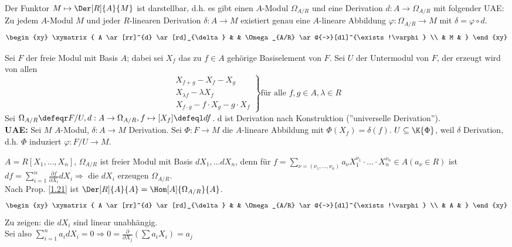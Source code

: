 \begin{PropDef}
\label{1.21}
  Der Funktor $M \mapsto \Der[R]{A}{M}$ ist \glqq darstellbar\grqq, d.h. es
  gibt
  einen $A$-Modul $\Omega_{A/R}$ und eine Derivation $d: A \to \Omega_{A/R}$ mit
  folgender UAE:\\
  Zu jedem $A$-Modul $M$ und jeder $R$-linearen Derivation $\delta: A \to M$
  existiert genau eine $A$-lineare Abbildung $\varphi: \Omega_{A/R} \to M$ mit
  $\delta = \varphi \circ d$.
  \[
    \begin{xy}
      \xymatrix{
         A \ar[rr]^{d} \ar[rd]_{\delta}  &     &  \Omega_{A/R} \ar@{-->}[dl]^{\exists!\varphi}  \\
                                         &  M  &
      }
    \end{xy}
  \]
\end{PropDef}

\begin{Bew}
  Sei $F$ der freie Modul mit Basis $A$; dabei sei $X_f$ das zu $f \in A$
  gehörige Basiselement von $F$.
  Sei $U$ der Untermodul von $F$, der erzeugt wird von allen
  \[\left. \begin{array}{l}
       X_{f+g} - X_f - X_g\\
       X_{\lambda f} - \lambda X_f\\
       X_{f \cdot g} - f \cdot X_g - g \cdot X_f
     \end{array} \right\} \text{für alle } f,g \in A, \lambda \in R\]
  Sei $\Omega_{A/R} \defeqr F/U, d: A \to \Omega_{A/R}, f \mapsto [X_f] \defeql
  d f$. d ist Derivation nach Konstruktion (''universelle Derivation'').\\
  \textbf{UAE:} Sei $M$ $A$-Modul, $\delta: A \to M$ Derivation. Sei $\Phi: F \to
  M$ die $A$-lineare Abbildung mit $\Phi(X_f) = \delta(f)$. $U \subseteq
  \K{\Phi}$, weil $\delta$ Derivation, d.h. $\Phi$ induziert $\varphi:
  F/U \to M$.
\end{Bew}

\begin{nnBsp}
  $A = R[X_1, \dots , X_n]$, $\Omega_{A/R}$ ist freier Modul mit Basis $d X_1,
  \dots d X_n$, denn für $f = \sum_{\nu = (\nu_1, \dots , \nu_n)} a_{\nu}
  X_1^{\nu_1} \cdot \dots \cdot X_n^{\nu_n} \in A (a_{\nu} \in R)$ ist $d f =
  \sum_{i=1}^n \frac{\partial f}{\partial X_i} d X_i \Rightarrow$ die $d X_i$
  erzeugen $\Omega_{A/R}$.\\
  Nach Prop. \ref{1.21} ist $\Der[R]{A}{A} = \Hom[A]{\Omega_{A/R}}{A}$.
  \[
    \begin{xy}
      \xymatrix{
         A \ar[rr]^{d} \ar[rd]_{\delta}  &     &  \Omega_{A/R} \ar@{-->}[dl]^{\exists!\varphi}  \\
                                         &  A  &
      }
    \end{xy}
  \]
  Zu zeigen: die $dX_i$ sind linear unabhängig.\\
  Sei also $\sum_{i = 1}^n a_i d X_i = 0 \Rightarrow 0 =
  \frac{\partial}{\partial X_j}(\sum a_i X_i) = a_j$
\end{nnBsp}

